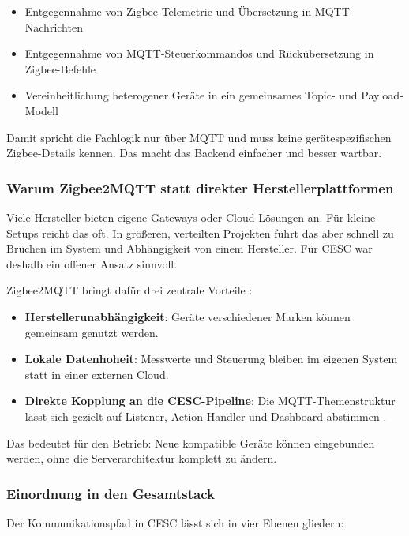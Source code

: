 \begin{itemize}
    \item Entgegennahme von Zigbee-Telemetrie und Übersetzung in MQTT-Nachrichten
    \item Entgegennahme von MQTT-Steuerkommandos und Rückübersetzung in Zigbee-Befehle
    \item Vereinheitlichung heterogener Geräte in ein gemeinsames Topic- und Payload-Modell
\end{itemize}

Damit spricht die Fachlogik nur über MQTT und muss keine gerätespezifischen Zigbee-Details kennen. Das macht das Backend einfacher und besser wartbar.

\subsubsection{Warum Zigbee2MQTT statt direkter Herstellerplattformen}

Viele Hersteller bieten eigene Gateways oder Cloud-Lösungen an. Für kleine Setups reicht das oft. In größeren, verteilten Projekten führt das aber schnell zu Brüchen im System und Abhängigkeit von einem Hersteller. Für CESC war deshalb ein offener Ansatz sinnvoll.

Zigbee2MQTT bringt dafür drei zentrale Vorteile \cite{zigbee2mqtt_docs}:

\begin{itemize}
    \item \textbf{Herstellerunabhängigkeit}: Geräte verschiedener Marken können gemeinsam genutzt werden.
    \item \textbf{Lokale Datenhoheit}: Messwerte und Steuerung bleiben im eigenen System statt in einer externen Cloud.
    \item \textbf{Direkte Kopplung an die CESC-Pipeline}: Die MQTT-Themenstruktur lässt sich gezielt auf Listener, Action-Handler und Dashboard abstimmen \cite{zigbee2mqtt_usage}.
\end{itemize}

Das bedeutet für den Betrieb: Neue kompatible Geräte können eingebunden werden, ohne die Serverarchitektur komplett zu ändern.

\subsubsection{Einordnung in den Gesamtstack}

Der Kommunikationspfad in CESC lässt sich in vier Ebenen gliedern:

